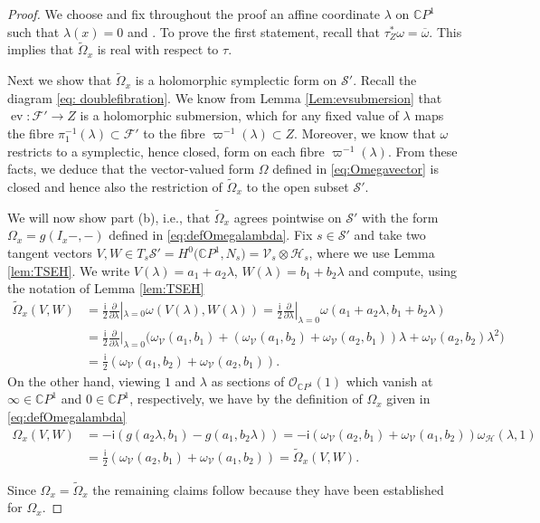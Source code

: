 \documentclass[pdftex]{sigma}
\numberwithin{equation}{section}
\theoremstyle{definition}
\newcommand\C{{\mathbb C}}
\renewcommand{\i}{\mathsf{i}}
\begin{document}
\begin{proof}
We choose and fix throughout the proof an affine coordinate $\lambda$ on $\C P^1$ such that $\lambda(x) = 0$ and .
To prove the first statement, recall that $\tau_Z^*\omega = \overline{\omega}$.
This implies that $\widetilde{\Omega}_x$ is real with respect to $\tau$.

Next we show that $\widetilde{\Omega}_x$ is a holomorphic symplectic form on $\mathcal{S}'$. Recall the diagram \eqref{eq: doublefibration}. We know from Lemma \ref{Lem:evsubmersion} that $\operatorname{ev}\colon \mathcal F' \longrightarrow Z$ is a holomorphic submersion, which for any fixed value of $\lambda$ maps the fibre $\pi_1^{-1}(\lambda)\subset \mathcal F'$ to the fibre $\varpi^{-1}(\lambda)\subset Z$. Moreover, we know that $\omega$ restricts to a symplectic, hence closed, form on each fibre $\varpi^{-1}(\lambda)$. From these facts, we deduce that the vector-valued form $\Omega$ defined in \eqref{eq:Omegavector} is closed and hence also the restriction of $\widetilde{\Omega}_x$ to the open subset $\mathcal{S}'$.

We will now show part (b), i.e., that $\widetilde{\Omega}_x$ agrees pointwise on $\mathcal S'$ with the form $\Omega_x = g(I_x - , -)$ defined in \eqref{eq:defOmegalambda}. Fix $s\in\mathcal S'$ and take two tangent vectors $V,W\in T_s\mathcal S' = H^0\bigl(\C P^1, N_s\bigr) = \mathcal V_s\otimes \mathcal H_s$, where we use Lemma \ref{lem:TSEH}. We write
$V(\lambda)= a_1 + a_2\lambda$, $ W(\lambda) = b_1+b_2\lambda$
and compute, using the notation of Lemma \ref{lem:TSEH}
\begin{align*}
\widetilde{\Omega}_x(V,W) &= \frac{\i}{2}\frac{\partial}{\partial\lambda}|_{\lambda=0}\omega(V(\lambda),W(\lambda))= \frac{\i}{2}\frac{\partial}{\partial\lambda}|_{\lambda=0} \omega(a_1+a_2\lambda,b_1+b_2\lambda)\\
 &= \frac{\i}{2}\frac{\partial}{\partial\lambda}|_{\lambda=0}\bigl(\omega_{\mathcal V}(a_1,b_1) + (\omega_{\mathcal V}(a_1,b_2)+\omega_{\mathcal V}(a_2,b_1))\lambda + \omega_{\mathcal V}(a_2,b_2)\lambda^2\bigr)\\
 &= \frac{\i}{2}(\omega_{\mathcal V}(a_1,b_2)+\omega_{\mathcal V}(a_2,b_1)).
\end{align*}
On the other hand, viewing $1$ and $\lambda$ as sections of $\mathcal O_{\C P^1}(1)$ which vanish at $\infty\in\C P^1$ and $0\in \C P^1$, respectively, we have by the definition of $\Omega_x$ given in \eqref{eq:defOmegalambda}
\begin{align*}
\Omega_x(V,W) &= -\i(g(a_2\lambda,b_1) - g(a_1,b_2\lambda))= -\i(\omega_{\mathcal V}(a_2,b_1) + \omega_{\mathcal V}(a_1,b_2))\omega_{\mathcal H}(\lambda,1)\\
&= \frac{\i}{2}(\omega_{\mathcal V}(a_2,b_1) + \omega_{\mathcal V}(a_1,b_2))= \widetilde{\Omega}_x(V,W).
\end{align*}

Since $\Omega_x =
\widetilde{\Omega}_x$ the remaining claims follow because they have been established for $\Omega_x$.
\end{proof}
\end{document}
